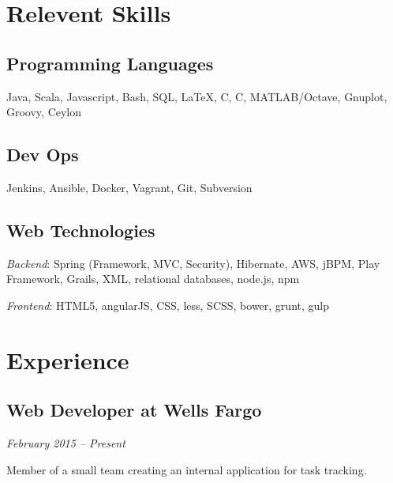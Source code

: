 \documentclass[a4paper,11pt]{article}
\newcommand{\CC}{C\nolinebreak\hspace{-.05em}\raisebox{.4ex}{\tiny\bf
    +}\nolinebreak\hspace{-.10em}\raisebox{.4ex}{\tiny\bf +}}
\def\CC{{C\nolinebreak[4]\hspace{-.05em}\raisebox{.4ex}{\tiny\bf ++}}}
\begin{document}

  \section*{Relevent Skills}

  \begin{multicols}{2}
    \raggedright

    \subsection*{Programming Languages}

    Java, Scala, Javascript, Bash, SQL, \LaTeX, C, \CC, MATLAB/Octave, Gnuplot, Groovy, Ceylon

    \subsection*{Dev Ops}

    Jenkins, Ansible, Docker, Vagrant, Git, Subversion
    \vfill
    \columnbreak

    \subsection*{Web Technologies}

    \textsl{Backend}: Spring (Framework, MVC, Security), Hibernate, AWS, jBPM, Play Framework,
    Grails, XML, relational databases, node.js, npm

    \textsl{Frontend}: HTML5, angularJS, CSS, less, SCSS, bower, grunt, gulp
    
    
  \end{multicols}
  

\vspace{-9pt}
\section*{Experience}

\subsection*{Web Developer at Wells Fargo}
\vskip -20pt
\hfill \textit{February 2015 -- Present}

Member of a small team creating an internal application for task tracking.
\end{document}
